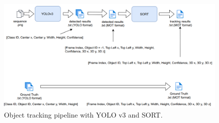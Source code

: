 \begin{figure}[!htbp]
  \centering
  \includegraphics[width=1.0\linewidth]{img/yolov3+SORT.png}
  \caption[Object tracking pipeline with YOLO v3 and SORT]
  {Object tracking pipeline with YOLO v3 and SORT.}
  \label{fig:yolov3+SORT}
\end{figure}